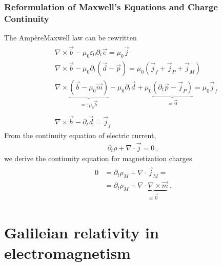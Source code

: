 \documentclass[letterpaper,10pt,english]{jupyterBook}
\begin{document}
\subsubsection{Reformulation of Maxwell’s Equations and Charge Continuity}
\label{\detokenize{ch/principles-matter-magnetization:reformulation-of-maxwell-s-equations-and-charge-continuity}}
\sphinxAtStartPar
The Ampère\sphinxhyphen{}Maxwell law can be rewritten
\begin{equation*}
\begin{split}\begin{aligned}
 & \nabla \times \vec{b} - \mu_0 \varepsilon_0 \partial_t \vec{e} = \mu_0 \vec{j} \\
 & \nabla \times \vec{b} - \mu_0 \partial_t \left( \vec{d} - \vec{p} \right) = \mu_0 \left( \vec{j}_f + \vec{j}_P + \vec{j}_M \right) \\
 & \nabla \times \underbrace{\left( \vec{b} - \mu_0 \vec{m} \right)}_{=: \mu_0 \vec{h}} - \mu_0 \partial_t \vec{d} + \mu_0 \underbrace{\left( \partial_t \vec{p} - \vec{j}_P \right)}_{= \vec{0}} = \mu_0 \vec{j}_f  \\ \\
 & \nabla \times \vec{h} - \partial_t \vec{d} = \vec{j}_f
\end{aligned}\end{split}
\end{equation*}
\sphinxAtStartPar
From the continuity equation of electric current,
\begin{equation*}
\begin{split}\partial_t \rho + \nabla \cdot \vec{j} = 0 \ ,\end{split}
\end{equation*}
\sphinxAtStartPar
we derive the continuity equation for magnetization charges
\begin{equation*}
\begin{split}\begin{aligned}
  0 & = \partial_t \rho_M + \nabla \cdot \vec{j}_M = \\
    & = \partial_t \rho_M + \underbrace{ \nabla \cdot \nabla \times \vec{m}}_{ \equiv \vec{0} } \ .
\end{aligned}\end{split}
\end{equation*}
\sphinxstepscope


\section{Galileian relativity in electromagnetism}
\label{\detokenize{ch/principles-relativity:galileian-relativity-in-electromagnetism}}\label{\detokenize{ch/principles-relativity:classical-electromagnetism-principles-low-speed-relativity}}\label{\detokenize{ch/principles-relativity::doc}}
\sphinxstepscope
\end{document}
